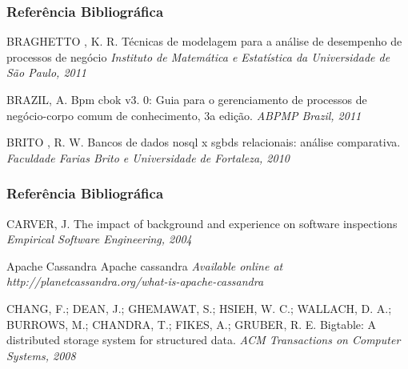 \documentclass[aspectratio=169]{beamer}
\begin{document}
\begin{frame}
\frametitle{Referência Bibliográfica}
\footnotesize{
\begin{thebibliography}{99} %

 BRAGHETTO , K. R.
\newblock Técnicas de modelagem para a análise de desempenho de processos de negócio
\newblock \emph{Instituto de Matemática e Estatística da Universidade de São Paulo, 2011}

 BRAZIL, A.
\newblock Bpm cbok v3. 0: Guia para o gerenciamento de processos de negócio-corpo comum de conhecimento, 3a edição.
\newblock \emph{ABPMP Brazil, 2011}


 BRITO , R. W.
\newblock Bancos de dados nosql x sgbds relacionais: análise comparativa.
\newblock \emph{Faculdade Farias Brito e Universidade de Fortaleza, 2010}

\end{thebibliography}
}
\end{frame}

\begin{frame}
\frametitle{Referência Bibliográfica}
\footnotesize{
\begin{thebibliography}{99} %

 CARVER, J.
\newblock The impact of background and experience on software inspections
\newblock \emph{Empirical Software Engineering, 2004}

 Apache Cassandra
\newblock Apache cassandra
\newblock \emph{Available online at http://planetcassandra.org/what-is-apache-cassandra}


 CHANG, F.; DEAN, J.; GHEMAWAT, S.; HSIEH, W. C.; WALLACH, D. A.; BURROWS, M.; CHANDRA, T.; FIKES, A.; GRUBER, R. E.  
\newblock Bigtable: A distributed storage system for structured data.
\newblock \emph{ACM Transactions on Computer Systems, 2008}

\end{thebibliography}
}
\end{frame}
\end{document}
